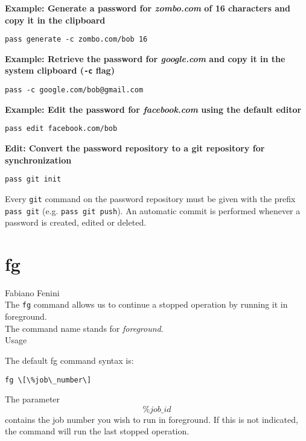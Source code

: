 \documentclass[hidelinks,12pt,a4paper,numbers=enddot]{scrartcl}
\begin{document}
\textbf{
Example: Generate a password for \emph{zombo.com} of 16 characters and copy it in
the clipboard
}

\begin{verbatim}
pass generate -c zombo.com/bob 16
\end{verbatim}


\textbf{
Example: Retrieve the password for \emph{google.com} and copy it in the system
clipboard (\texttt{-c} flag)
}

\begin{verbatim}
pass -c google.com/bob@gmail.com
\end{verbatim}


\textbf{
Example: Edit the password for \emph{facebook.com} using the default editor
}

\begin{verbatim}
pass edit facebook.com/bob
\end{verbatim}


\textbf{
Edit: Convert the password repository to a git repository for synchronization
}

\begin{verbatim}
pass git init
\end{verbatim}



Every \texttt{git} command on the password repository must be given with
the prefix \texttt{pass git} (e.g. \texttt{pass git push}). An
automatic commit is performed whenever a password is created, edited or
deleted.


\section{fg}


\large Fabiano Fenini \normalsize\\


The \texttt{fg} command allows us to continue a stopped operation by running it
in foreground.\\

The command name stands for \emph{foreground}.\\

Usage

The default fg command syntax is:

\begin{verbatim}
fg \[\%job\_number\]
\end{verbatim}

The parameter \[\%job\_id\] contains the job number you wish to run in foreground.
If this is not indicated, the command will run the last stopped operation.\\
\end{document}
